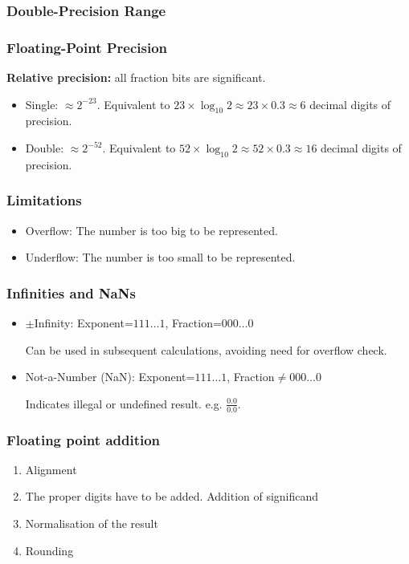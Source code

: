 \subsubsection{Double-Precision Range}

\subsubsection{Floating-Point Precision}
\textbf{Relative precision:} all fraction bits are significant. 
\begin{itemize}
    \item Single: $\approx 2^{-23}$. Equivalent to $23\times \log_10 2 \approx 23 \times 0.3 \approx 6$ decimal digits of precision. 
    \item Double: $\approx 2^{-52}$. Equivalent to $52\times \log_10 2 \approx 52 \times 0.3 \approx 16$ decimal digits of precision.
\end{itemize}

\subsubsection{Limitations}
\begin{itemize}
    \item Overflow: The number is too big to be represented. 
    \item Underflow: The number is too small to be represented. 
\end{itemize}

\subsubsection{Infinities and NaNs}
\begin{itemize}
    \item $\pm$Infinity: Exponent=$111\dots 1$, Fraction=$000\dots0$
    
    Can be used in subsequent calculations, avoiding need for overflow check. 
    \item Not-a-Number (NaN): Exponent=$111\dots 1$, Fraction$\ne 000\dots0$
    
    Indicates illegal or undefined result. e.g. $\frac{0.0}{0.0}$.  
\end{itemize}

\subsubsection{Floating point addition}
\begin{enumerate}
    \item Alignment
    \item The proper digits have to be added. Addition of significand
    \item Normalisation of the result
    \item Rounding
\end{enumerate}

